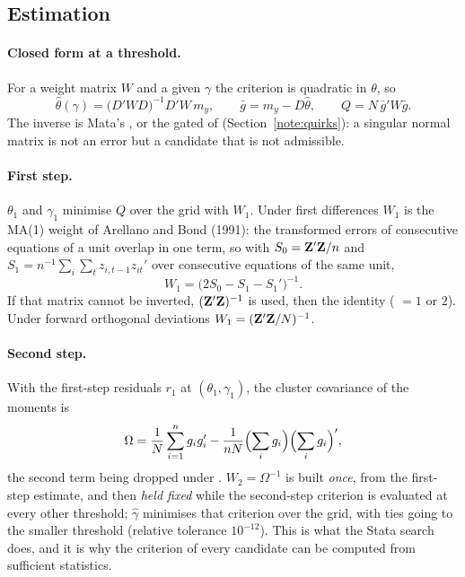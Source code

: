 \subsection{Estimation}\label{note:est}

\paragraph{Closed form at a threshold.} For a weight matrix $W$ and a given $\gamma$ the criterion is
quadratic in $\theta$, so
\begin{equation}\label{eq:theta}
\hat\theta(\gamma)=\bigl(D'WD\bigr)^{-1}D'W\,m_y,\qquad
\bar g=m_y-D\hat\theta,\qquad Q=N\,\bar g'W\bar g .
\end{equation}
The inverse is Mata's , or the gated  of 
(Section~\ref{note:quirks}): a singular normal matrix is not an error but a candidate that is not
admissible.

\paragraph{First step.} $\theta_1$ and $\gamma_1$ minimise $Q$ over the grid with $W_1$. Under first
differences $W_1$ is the MA(1) weight of Arellano and Bond (1991): the transformed errors of
consecutive equations of a unit overlap in one term, so with $S_0=\mathbf{Z}'\mathbf{Z}/n$ and
$S_1=n^{-1}\sum_i\sum_t z_{i,t-1}z_{it}'$ over consecutive equations of the same unit,
\begin{equation}\label{eq:w1}
W_1=\bigl(2S_0-S_1-S_1'\bigr)^{-1}.
\end{equation}
If that matrix cannot be inverted, $(\mathbf{Z}'\mathbf{Z})^{-1}$ is used, then the identity
( $=1$ or $2$). Under forward orthogonal deviations $W_1=(\mathbf{Z}'\mathbf{Z}/N)^{-1}$.

\paragraph{Second step.} With the first-step residuals $r_1$ at $(\theta_1,\gamma_1)$, the cluster
covariance of the moments is
\begin{equation}\label{eq:omega}
\Omega=\frac1N\sum_{i=1}^n g_ig_i'-\frac{1}{nN}\Bigl(\sum_i g_i\Bigr)\Bigl(\sum_i g_i\Bigr)',
\end{equation}
the second term being dropped under . $W_2=\Omega^{-1}$ is built \emph{once}, from the
first-step estimate, and then \emph{held fixed} while the second-step criterion is evaluated at every
other threshold; $\hat\gamma$ minimises that criterion over the grid, with ties going to the smaller
threshold (relative tolerance $10^{-12}$). This is what the Stata search does, and it is why the
criterion of every candidate can be computed from sufficient statistics.

